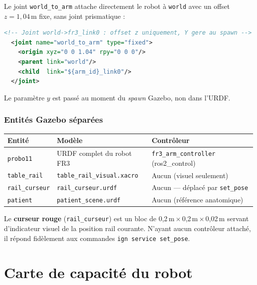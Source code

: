 \documentclass[11pt, a4paper]{article}
\newcommand{\file}[1]{\texttt{\color{AccentTeal}#1}}
\begin{document}
Le joint \texttt{world\_to\_arm} attache directement le robot à \texttt{world} avec un offset $z = 1{,}04$\,m fixe, sans joint prismatique :

\begin{lstlisting}[language=xml]
  <!-- Joint world->fr3_link0 : offset z uniquement, Y gere au spawn -->
  <joint name="world_to_arm" type="fixed">
    <origin xyz="0 0 1.04" rpy="0 0 0"/>
    <parent link="world"/>
    <child  link="${arm_id}_link0"/>
  </joint>
\end{lstlisting}

Le paramètre $y$ est passé au moment du \textit{spawn} Gazebo, non dans l'URDF.

\subsubsection{Entités Gazebo séparées}

\begin{center}
\begin{tabular}{lll}
  \toprule
  \rowcolor{LightTeal}
  \textbf{Entité} & \textbf{Modèle} & \textbf{Contrôleur} \\
  \midrule
  \texttt{probo11}      & URDF complet du robot FR3     & \texttt{fr3\_arm\_controller} (ros2\_control) \\
  \texttt{table\_rail}  & \file{table\_rail\_visual.xacro} & Aucun (visuel seulement) \\
  \texttt{rail\_curseur}& \file{rail\_curseur.urdf}        & Aucun — déplacé par \texttt{set\_pose} \\
  \texttt{patient}      & \file{patient\_scene.urdf}       & Aucun (référence anatomique) \\
  \bottomrule
\end{tabular}
\end{center}

Le \textbf{curseur rouge} (\texttt{rail\_curseur}) est un bloc de 0,2\,m\,$\times$\,0,2\,m\,$\times$\,0,02\,m servant d'indicateur visuel de la position rail courante. N'ayant aucun contrôleur attaché, il répond fidèlement aux commandes \texttt{ign service set\_pose}.

\section{Carte de capacité du robot}
\end{document}
